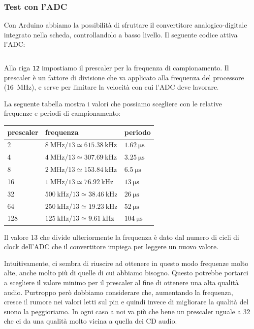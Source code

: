 \documentclass[a4paper,11pt]{article}
\newcommand\source[2]{
	\inputminted[fontsize=\footnotesize,linenos=true,tabsize=4]{#1}{#2}
}
\begin{document}
\subsubsection{Test con l'ADC}
Con Arduino abbiamo la possibilità di sfruttare il convertitore analogico-digitale integrato nella scheda, controllandolo a basso livello. Il seguente codice attiva l'ADC:

\source{cpp}{adc_setup_rel}

Alla riga \texttt{12} impostiamo il prescaler per la frequenza di campionamento. Il prescaler è un fattore di divisione che va applicato alla frequenza del processore (\SI{16}{\mega\hertz}), e serve per limitare la velocità con cui l'ADC deve lavorare.

La seguente tabella mostra i valori che possiamo scegliere con le relative frequenze e periodi di campionamento:

\begin{table}[h]
\centering
\begin{tabular}{lll}
\textbf{prescaler} & \textbf{frequenza}                                        & \textbf{periodo}         \\ \hline
2                    & $\SI{8}{\mega\hertz} / 13 \simeq \SI{615.38}{\kilo\hertz}$  & $\SI{1.62}{\micro\second}$ \\
4                    & $\SI{4}{\mega\hertz} / 13 \simeq \SI{307.69}{\kilo\hertz}$  & $\SI{3.25}{\micro\second}$ \\
8                    & $\SI{2}{\mega\hertz} / 13 \simeq \SI{153.84}{\kilo\hertz}$  & $\SI{6.5}{\micro\second}$  \\
16                   & $\SI{1}{\mega\hertz} / 13 \simeq \SI{76.92}{\kilo\hertz}$   & $\SI{13}{\micro\second}$   \\
32                   & $\SI{500}{\kilo\hertz} / 13 \simeq \SI{38.46}{\kilo\hertz}$ & $\SI{26}{\micro\second}$   \\
64                   & $\SI{250}{\kilo\hertz} / 13 \simeq \SI{19.23}{\kilo\hertz}$ & $\SI{52}{\micro\second}$   \\
128                  & $\SI{125}{\kilo\hertz} / 13 \simeq \SI{9.61}{\kilo\hertz}$  & $\SI{104}{\micro\second}$
\end{tabular}
\end{table}

Il valore \num{13} che divide ulteriormente la frequenza è dato dal numero di cicli di clock dell'ADC che il convertitore impiega per leggere un nuovo valore.

Intuitivamente, ci sembra di riuscire ad ottenere in questo modo frequenze molto alte, anche molto più di quelle di cui abbiamo bisogno. Questo potrebbe portarci a scegliere il valore minimo per il prescaler al fine di ottenere una alta qualità audio. Purtroppo però dobbiamo considerare che, aumentando la frequenza, cresce il rumore nei valori letti sul pin e quindi invece di migliorare la qualità del suono la peggioriamo. In ogni caso a noi va più che bene un prescaler uguale a \num{32} che ci da una qualità molto vicina a quella dei CD audio.
\end{document}
